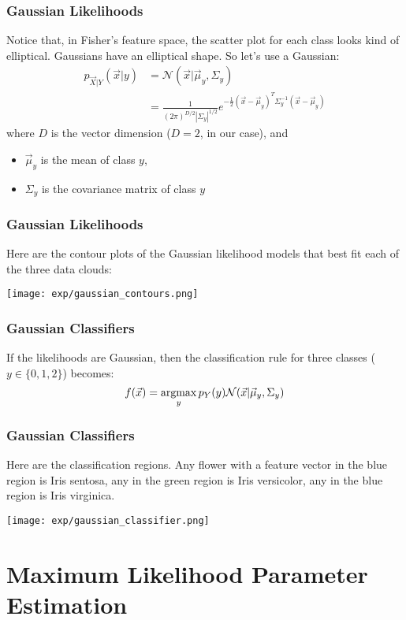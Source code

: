 \documentclass{beamer}
\newcommand{\argmax}{\operatornamewithlimits{argmax}}
\begin{document}
\begin{frame}
  \frametitle{Gaussian Likelihoods}

  Notice that, in Fisher's feature space, the scatter plot for each
  class looks kind of  elliptical.  Gaussians have an elliptical shape.
  So let's use a Gaussian:
  \begin{align*}
    p_{\vec{X}|Y}(\vec{x}|y) &= {\mathcal N}(\vec{x}|\vec\mu_y,\Sigma_y)\\
    &= \frac{1}{(2\pi)^{D/2}|\Sigma_y|^{1/2}}
    e^{-\frac{1}{2}(\vec{x}-\vec\mu_y)^T\Sigma_y^{-1}(\vec{x}-\vec\mu_y)}
  \end{align*}
  where $D$ is the vector dimension ($D=2$, in our case), and
  \begin{itemize}
  \item $\vec\mu_y$ is the mean of class $y$,
  \item $\Sigma_y$ is the covariance matrix of class $y$
  \end{itemize}
\end{frame}

\begin{frame}
  \frametitle{Gaussian Likelihoods}

  Here are the contour plots of the Gaussian likelihood models that best fit
  each of the three data clouds:
  \centerline{\texttt{[image: exp/gaussian\_contours.png]}}
\end{frame}

\begin{frame}
  \frametitle{Gaussian Classifiers}

  If the likelihoods are Gaussian, then the classification rule for
  three classes ($y\in\{0,1,2\}$) becomes:
  \begin{displaymath}
    f(\vec{x}) =\argmax_y p_Y(y){\mathcal N}(\vec{x}|\vec\mu_y,\Sigma_y)
  \end{displaymath}
\end{frame}

\begin{frame}
  \frametitle{Gaussian Classifiers}

  Here are the classification regions.  Any flower with a feature
  vector in the blue region is Iris sentosa, any in the green region
  is Iris versicolor, any in the blue region is Iris virginica.
  \centerline{\texttt{[image: exp/gaussian\_classifier.png]}}
\end{frame}

\section[Parameters]{Maximum Likelihood Parameter Estimation}
\setcounter{subsection}{1}
\end{document}
